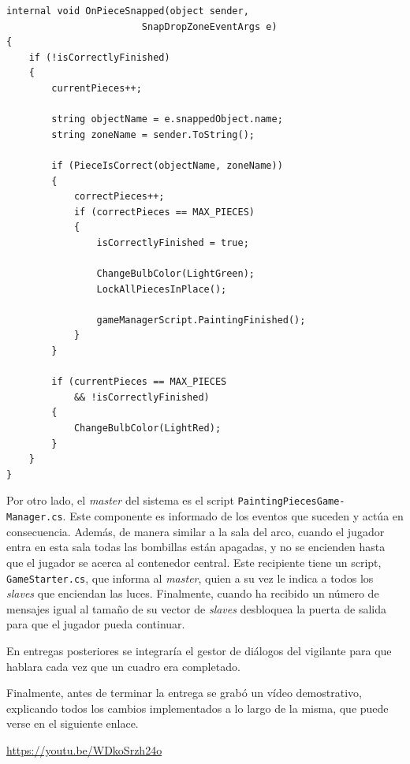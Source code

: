 \begin{lstlisting}[caption=Fragmento del script detectar piezas de cuadros, label=lst:painting-checker]
internal void OnPieceSnapped(object sender, 
                        SnapDropZoneEventArgs e)
{
    if (!isCorrectlyFinished)
    {
        currentPieces++;
    
        string objectName = e.snappedObject.name;
        string zoneName = sender.ToString();
    
        if (PieceIsCorrect(objectName, zoneName))
        {
            correctPieces++;
            if (correctPieces == MAX_PIECES)
            {
                isCorrectlyFinished = true;
    
                ChangeBulbColor(LightGreen);
                LockAllPiecesInPlace();
    
                gameManagerScript.PaintingFinished();
            }
        }
    
        if (currentPieces == MAX_PIECES 
            && !isCorrectlyFinished)
        {
            ChangeBulbColor(LightRed);
        }
    }
}
\end{lstlisting}

Por otro lado, el \textit{master} del sistema es el script \texttt{PaintingPiecesGame-} \texttt{Manager.cs}. Este componente es informado de los eventos que suceden y actúa en consecuencia. Además, de manera similar a la sala del arco, cuando el jugador entra en esta sala todas las bombillas están apagadas, y no se encienden hasta que el jugador se acerca al contenedor central. Este recipiente tiene un script, \texttt{GameStarter.cs}, que informa al \textit{master}, quien a su vez le indica a todos los \textit{slaves} que enciendan las luces. Finalmente, cuando ha recibido un número de mensajes igual al tamaño de su vector de \textit{slaves} desbloquea la puerta de salida para que el jugador pueda continuar.

En entregas posteriores se integraría el gestor de diálogos del vigilante para que hablara cada vez que un cuadro era completado.

Finalmente, antes de terminar la entrega se grabó un vídeo demostrativo, explicando todos los cambios implementados a lo largo de la misma, que puede verse en el siguiente enlace.

\begin{center}
    \url{https://youtu.be/WDkoSrzh24o}
\end{center}



